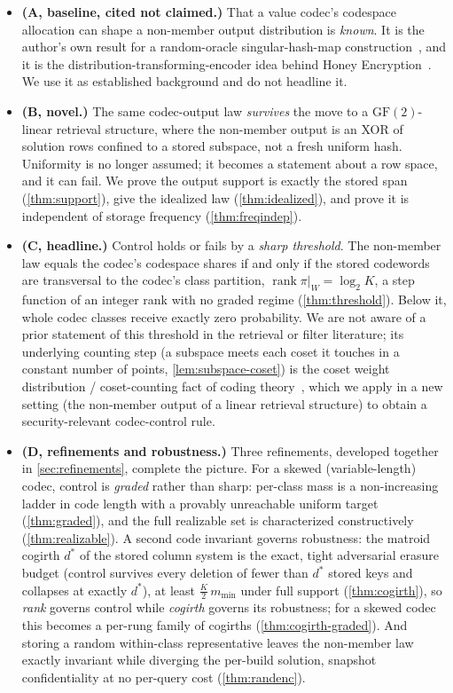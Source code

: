 \documentclass[11pt]{article}
\theoremstyle{definition}
\theoremstyle{plain}
\theoremstyle{remark}
\newcommand{\GF}{\mathrm{GF}(2)}
\DeclareMathOperator{\rank}{rank}
\newcommand{\W}{W}                          %
\newcommand{\proj}{\pi}                     %
\begin{document}
\begin{itemize}
  \item \textbf{(A, baseline, cited not claimed.)} That a value codec's codespace
  allocation can shape a non-member output distribution is \emph{known}. It is the
  author's own result for a random-oracle singular-hash-map
  construction~\cite{towell_bernoulli_maps}, and it is the
  distribution-transforming-encoder idea behind Honey
  Encryption~\cite{juels2014honey,cheng2019pmte}. We use it as established
  background and do not headline it.
  \item \textbf{(B, novel.)} The same codec-output law \emph{survives} the move to a
  $\GF$-linear retrieval structure, where the non-member output is an XOR of solution
  rows confined to a stored subspace, not a fresh uniform hash. Uniformity is no
  longer assumed; it becomes a statement about a row space, and it can fail. We prove
  the output support is exactly the stored span (\cref{thm:support}), give the
  idealized law (\cref{thm:idealized}), and prove it is independent of storage
  frequency (\cref{thm:freqindep}).
  \item \textbf{(C, headline.)} Control holds or fails by a \emph{sharp threshold}.
  The non-member law equals the codec's codespace shares if and only if the stored
  codewords are transversal to the codec's class partition, $\rank \proj|_{\W} =
  \log_2 K$, a step function of an integer rank with no graded regime
  (\cref{thm:threshold}). Below it, whole codec classes receive exactly zero
  probability. We are not aware of a prior statement of this threshold in the retrieval
  or filter literature; its underlying counting step (a subspace meets each coset it
  touches in a constant number of points, \cref{lem:subspace-coset}) is the coset weight
  distribution / coset-counting fact of coding theory~\cite{macwilliams1977}, which we
  apply in a new setting (the non-member output of a linear retrieval structure) to
  obtain a security-relevant codec-control rule.
  \item \textbf{(D, refinements and robustness.)} Three refinements, developed together in
  \cref{sec:refinements}, complete the picture. For a skewed (variable-length) codec,
  control is \emph{graded} rather than sharp: per-class mass is a non-increasing ladder in
  code length with a provably unreachable uniform target (\cref{thm:graded}), and the full
  realizable set is characterized constructively (\cref{thm:realizable}). A second code
  invariant governs robustness: the matroid cogirth $d^\ast$ of the stored column system is
  the exact, tight adversarial erasure budget (control survives every deletion of fewer than
  $d^\ast$ stored keys and collapses at exactly $d^\ast$), at least $\tfrac{K}{2}\,m_{\min}$
  under full support (\cref{thm:cogirth}), so \emph{rank} governs control while
  \emph{cogirth} governs its robustness; for a skewed codec this becomes a per-rung family
  of cogirths (\cref{thm:cogirth-graded}). And storing a random within-class representative
  leaves the non-member law exactly invariant while diverging the per-build solution,
  snapshot confidentiality at no per-query cost (\cref{thm:randenc}).
\end{itemize}
\end{document}
